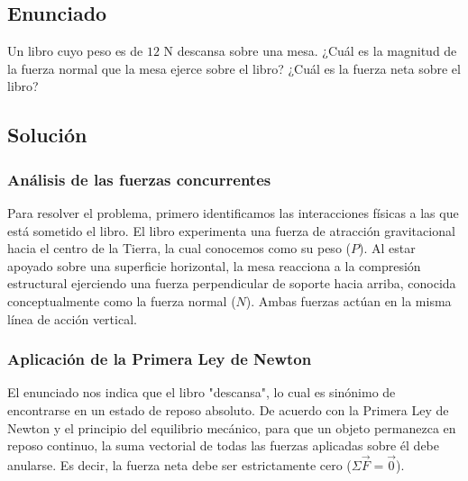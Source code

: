 \documentclass[12pt, a4paper]{article}
\begin{document}
\newpage

\subsection*{Enunciado}
Un libro cuyo peso es de $12 \text{ N}$ descansa sobre una mesa. ¿Cuál es la magnitud de la fuerza normal que la mesa ejerce sobre el libro? ¿Cuál es la fuerza neta sobre el libro?

\begin{center}
\end{center}

\subsection*{Solución}

\subsubsection*{Análisis de las fuerzas concurrentes}
Para resolver el problema, primero identificamos las interacciones físicas a las que está sometido el libro. El libro experimenta una fuerza de atracción gravitacional hacia el centro de la Tierra, la cual conocemos como su peso ($P$). Al estar apoyado sobre una superficie horizontal, la mesa reacciona a la compresión estructural ejerciendo una fuerza perpendicular de soporte hacia arriba, conocida conceptualmente como la fuerza normal ($N$). Ambas fuerzas actúan en la misma línea de acción vertical.

\subsubsection*{Aplicación de la Primera Ley de Newton}
El enunciado nos indica que el libro "descansa", lo cual es sinónimo de encontrarse en un estado de reposo absoluto. De acuerdo con la Primera Ley de Newton y el principio del equilibrio mecánico, para que un objeto permanezca en reposo continuo, la suma vectorial de todas las fuerzas aplicadas sobre él debe anularse. Es decir, la fuerza neta debe ser estrictamente cero ($\Sigma\vec{F} = \vec{0}$).
\end{document}
